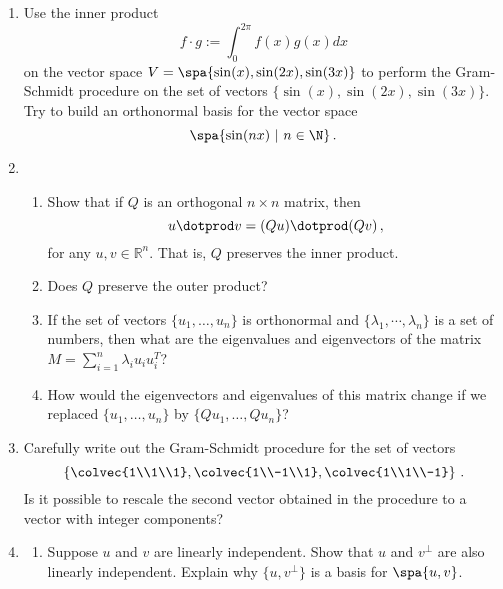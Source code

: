 \begin{enumerate}
\item Use the inner product \[f\cdot g := \int_0^{2\pi} f(x)g(x)dx\]  on the vector space $V=\spa\{\sin(x),\sin(2x),\sin(3x) \}$ to perform the Gram-Schmidt procedure on the set of vectors $\{\sin(x),\sin(2x),\sin(3x) \}$. \\
Try to build an orthonormal basis for the vector space \[\spa \{ \sin(nx)~| ~n\in \N \}\, .\]
\item 
\begin{enumerate}
\item
Show that if $Q$ is an orthogonal $n\times n$ matrix, then \[u\dotprod v = (Qu)\dotprod (Qv)\, ,\] for any $u,v\in \mathbb{R}^n$. That is, $Q$ preserves the inner product. 
\item Does $Q$ preserve the outer product? 
\item  If the set of vectors $\{ u_1,\dots,u_n\}$ is orthonormal and $\{ \lambda_1,\cdots,\lambda_n\}$ is a set of numbers, 
then what are the eigenvalues and eigenvectors of the matrix
$M=\sum_{i=1}^n \lambda_i u_i u_i^T$? 
\item How would the eigenvectors and eigenvalues of this matrix change if we replaced  $\{ u_1,\dots,u_n\}$ by $\{ Qu_1,\dots,Q u_n\}$?
\end{enumerate}


\item Carefully write out the Gram-Schmidt procedure for the set of vectors 
\[\left\{ \colvec{1\\1\\1}, \colvec{1\\-1\\1}, \colvec{1\\1\\-1} \right\} \, .\] Is it possible to rescale the second vector obtained in the procedure to a vector with integer components? 


\item 
\label{basisortho}
\begin{enumerate}
\item Suppose $u$ and $v$ are linearly independent.  Show that $u$ and $v^\perp$ are also linearly independent.  Explain why $\{u, v^\perp\}$ is a basis for $\spa \{u,v\}$.





\end{enumerate}
\end{enumerate}
